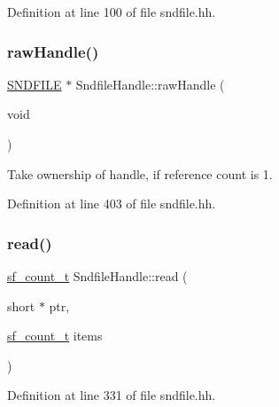 Definition at line 100 of file sndfile.\+hh.

\mbox{\label{class_sndfile_handle_a605153c4c3e84557cd60eb3978fc8539}} 
\subsubsection{\texorpdfstring{rawHandle()}{rawHandle()}}
{\footnotesize\ttfamily \mbox{\hyperlink{sndfile_8h_ac14209bc83d532b06a8cdf9ade6d544a}{S\+N\+D\+F\+I\+LE}} $\ast$ Sndfile\+Handle\+::raw\+Handle (\begin{DoxyParamCaption}\item[{void}]{ }\end{DoxyParamCaption})\hspace{0.3cm}{\ttfamily [inline]}}

Take ownership of handle, if reference count is 1. 

Definition at line 403 of file sndfile.\+hh.

\mbox{\label{class_sndfile_handle_ae3125a94ea83be0193dead02b151d008}} 
\subsubsection{\texorpdfstring{read()}{read()}\hspace{0.1cm}{\footnotesize\ttfamily [1/4]}}
{\footnotesize\ttfamily \mbox{\hyperlink{sndfile_8h_af2b12fded74bc949f1f1f392a2af4892}{sf\+\_\+count\+\_\+t}} Sndfile\+Handle\+::read (\begin{DoxyParamCaption}\item[{short $\ast$}]{ptr,  }\item[{\mbox{\hyperlink{sndfile_8h_af2b12fded74bc949f1f1f392a2af4892}{sf\+\_\+count\+\_\+t}}}]{items }\end{DoxyParamCaption})\hspace{0.3cm}{\ttfamily [inline]}}



Definition at line 331 of file sndfile.\+hh.

\mbox{\label{class_sndfile_handle_af6d8fa499d36a9bd68301023800ac8b9}} 
